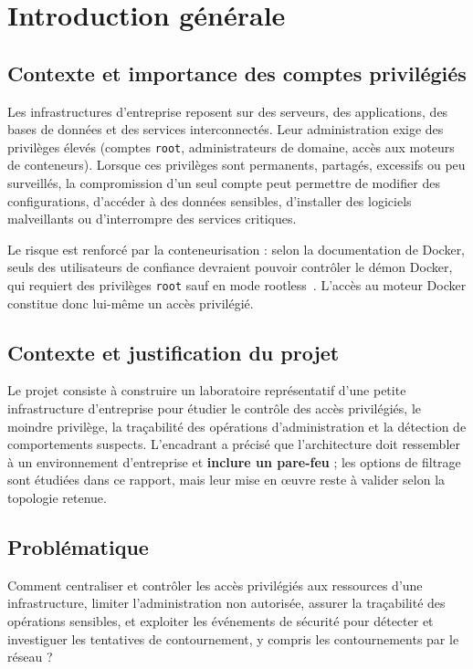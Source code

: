 \documentclass[11pt,a4paper]{report}
\begin{document}
\chapter{Introduction générale}

\section{Contexte et importance des comptes privilégiés}
Les infrastructures d'entreprise reposent sur des serveurs, des applications, des bases de données et des services interconnectés. Leur administration exige des privilèges élevés (comptes \texttt{root}, administrateurs de domaine, accès aux moteurs de conteneurs). Lorsque ces privilèges sont permanents, partagés, excessifs ou peu surveillés, la compromission d'un seul compte peut permettre de modifier des configurations, d'accéder à des données sensibles, d'installer des logiciels malveillants ou d'interrompre des services critiques.

Le risque est renforcé par la conteneurisation : selon la documentation de Docker, seuls des utilisateurs de confiance devraient pouvoir contrôler le démon Docker, qui requiert des privilèges \texttt{root} sauf en mode rootless~\cite{docker-sec}. L'accès au moteur Docker constitue donc lui-même un accès privilégié.

\section{Contexte et justification du projet}
Le projet consiste à construire un laboratoire représentatif d'une petite infrastructure d'entreprise pour étudier le contrôle des accès privilégiés, le moindre privilège, la traçabilité des opérations d'administration et la détection de comportements suspects. L'encadrant a précisé que l'architecture doit ressembler à un environnement d'entreprise et \textbf{inclure un pare-feu} ; les options de filtrage sont étudiées dans ce rapport, mais leur mise en œuvre reste à valider selon la topologie retenue.

\section{Problématique}
Comment centraliser et contrôler les accès privilégiés aux ressources d'une infrastructure, limiter l'administration non autorisée, assurer la traçabilité des opérations sensibles, et exploiter les événements de sécurité pour détecter et investiguer les tentatives de contournement, y compris les contournements par le réseau ?
\end{document}

